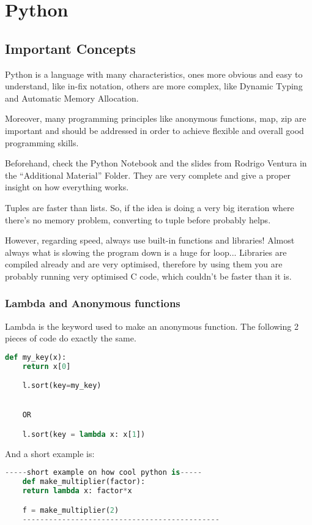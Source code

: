 \section{Python}


\subsection{Important Concepts}
Python is a language with many characteristics, ones more obvious and easy to understand, like in-fix notation, others are more complex, like Dynamic Typing and Automatic Memory Allocation.

Moreover, many programming principles like anonymous functions, map, zip are important and should be addressed in order to achieve flexible and overall good programming skills.

Beforehand, check the Python Notebook and the slides from Rodrigo Ventura in the ``Additional Material'' Folder. They are very complete and give a proper insight on how everything works.

Tuples are faster than lists. So, if the idea is doing a very big iteration where there's no memory problem, converting to tuple before probably helps. 

However, regarding speed, always use built-in functions and libraries! Almost always what is slowing the program down is a huge for loop... Libraries are compiled already and are very optimised, therefore by using them you are probably running very optimised C code, which couldn't be faster than it is.


\subsubsection{Lambda and Anonymous functions}
Lambda is the keyword used to make an anonymous function. The following 2 pieces of code do exactly the same.

\begin{lstlisting}[language=python]
    def my_key(x):
    return x[0]

    l.sort(key=my_key)


    OR

    l.sort(key = lambda x: x[1])
\end{lstlisting}

And a short example is:
\begin{lstlisting}[language=python]
    -----short example on how cool python is-----
    def make_multiplier(factor):
    return lambda x: factor*x

    f = make_multiplier(2)
    ---------------------------------------------
\end{lstlisting}

